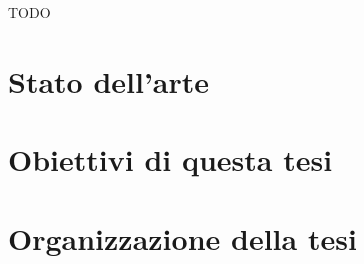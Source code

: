 TODO 

\section{Stato dell'arte}
\label{sec:StateDellArte}

\section{Obiettivi di questa tesi}
\label{sec:ObbiettiviTesi}

\section{Organizzazione della tesi}
\label{sec:OrganizzazioneTesi}

